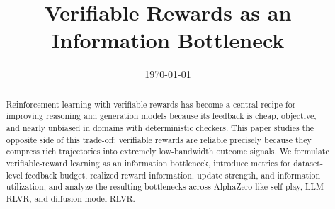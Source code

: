 \documentclass[11pt]{article}
\title{Verifiable Rewards as an Information Bottleneck}
\author{}
\date{\today}
\newcommand{\rlvr}{\textsc{RLVR}}
\newcommand{\llm}{\textsc{LLM}}
\begin{document}
\maketitle

\begin{abstract}
Reinforcement learning with verifiable rewards has become a central recipe for improving reasoning and generation models because its feedback is cheap, objective, and nearly unbiased in domains with deterministic checkers. This paper studies the opposite side of this trade-off: verifiable rewards are reliable precisely because they compress rich trajectories into extremely low-bandwidth outcome signals. We formulate verifiable-reward learning as an information bottleneck, introduce metrics for dataset-level feedback budget, realized reward information, update strength, and information utilization, and analyze the resulting bottlenecks across AlphaZero-like self-play, \llm{} \rlvr{}, and diffusion-model \rlvr{}.
\end{abstract}












\end{document}
